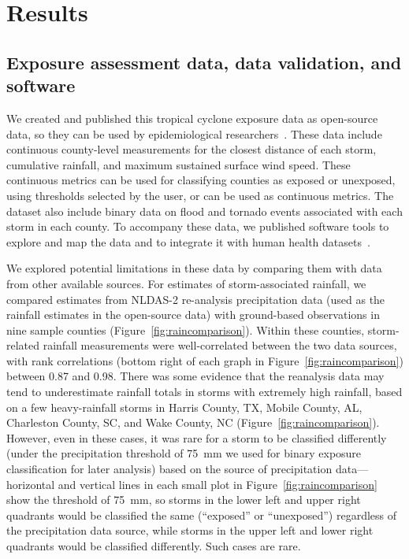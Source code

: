\section*{Results}

\subsection*{Exposure assessment data, data validation, and software}

We created and published this tropical cyclone exposure data as open-source
data, so they can be used by epidemiological
researchers~\parencite{hurricaneexposuredata}. These data include continuous
county-level measurements for the closest distance of each storm, cumulative
rainfall, and maximum sustained surface wind speed. These continuous metrics
can be used for classifying counties as exposed or unexposed, using thresholds
selected by the user, or can be used as continuous metrics. The dataset also
include binary data on flood and tornado events associated with each storm in
each county. To accompany these data, we published software tools to explore
and map the data and to integrate it with human health
datasets~\parencite{hurricaneexposure}. 

We explored potential limitations in these data by comparing them with data
from other available sources.  For estimates of storm-associated rainfall, we
compared estimates from NLDAS-2 re-analysis precipitation data (used as the
rainfall estimates in the open-source data) with ground-based observations in
nine sample counties (Figure~\ref{fig:raincomparison}). Within these counties,
storm-related rainfall measurements were well-correlated between the two data
sources, with rank correlations (bottom right of each graph in
Figure~\ref{fig:raincomparison}) between 0.87 and 0.98. There was some evidence
that the reanalysis data may tend to underestimate rainfall totals in storms
with extremely high rainfall, based on a few heavy-rainfall storms in Harris
County, TX, Mobile County, AL, Charleston County, SC, and Wake County, NC
(Figure~\ref{fig:raincomparison}). However, even in these cases, it was rare
for a storm to be classified differently (under the precipitation threshold
of 75~\si{\milli\metre} we used for binary exposure classification for later
analysis) based on the source of precipitation data---horizontal and vertical
lines in each small plot in Figure~\ref{fig:raincomparison} show the threshold
of 75~\si{\milli\metre}, so storms in the lower left and upper right quadrants
would be classified the same (``exposed'' or ``unexposed'') regardless of the
precipitation data source, while storms in the upper left and lower right
quadrants would be classified differently. Such cases are rare.

